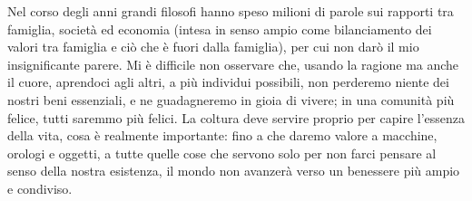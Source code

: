 Nel corso degli anni grandi filosofi hanno speso milioni di parole sui rapporti tra famiglia, società ed economia (intesa in senso ampio come bilanciamento dei valori tra famiglia e ciò che è fuori dalla famiglia), per cui non darò il mio insignificante parere. Mi è difficile non osservare che, usando la ragione ma anche il cuore, aprendoci agli altri, a più individui possibili, non perderemo niente dei nostri beni essenziali, e ne guadagneremo in gioia di vivere; in una comunità più felice, tutti saremmo più felici. La coltura deve servire proprio per capire l'essenza della vita, cosa è realmente importante: fino a che daremo valore a macchine, orologi e oggetti, a tutte quelle cose che servono solo per non farci pensare al senso della nostra esistenza, il mondo non avanzerà verso un benessere più ampio e condiviso.

























\newpage